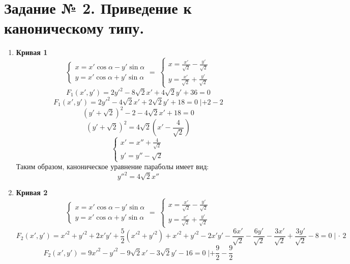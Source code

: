 \documentclass{article}
\theoremstyle{plain}
\begin{document}
\section{Задание № 2. Приведение к каноническому типу.}
\begin{enumerate}
    \item \textbf{Кривая 1}
    \begin{equation}
        \begin{cases}
        x = x'\cos{\alpha} - y'\sin{\alpha}\\
        y = x'\cos{\alpha} + y'\sin{\alpha}
        \end{cases} = \;
        \begin{cases}
        x = \frac{x'}{\sqrt{2}} - \frac{y'}{\sqrt{2}}\\
        y = \frac{x'}{\sqrt{2}} + \frac{y'}{\sqrt{2}}
        \end{cases}
    \end{equation}
    $$F_1(x', y') = 2y'^2 - 8\sqrt{2}x' + 4\sqrt{2}y' + 36 = 0$$
    $$F_1(x', y') = 2y'^2 - 4\sqrt{2}x' + 2\sqrt{2}y' + 18 = 0 \;| + 2 - 2$$
    $$ (y' + \sqrt{2})^2 - 2 - 4\sqrt{2}x' + 18 = 0$$
    $$ (y' + \sqrt{2})^2 = 4\sqrt{2}(x' - \frac{4}{\sqrt{2}})$$
    \begin{equation}
        \begin{cases}
        x' = x'' + \frac{4}{\sqrt{2}} \\
        y' = y'' - \sqrt{2}
        \end{cases}
    \end{equation}
    Таким образом, каноническое уравнение параболы имеет вид: $$y''^2 = 4\sqrt{2}x''$$
    \item \textbf{Кривая 2}
    \begin{equation}
    \begin{cases}
     x = x'\cos{\alpha} - y'\sin{\alpha}\\
    y = x'\cos{\alpha} + y'\sin{\alpha}
     \end{cases} = \;
        \begin{cases}
        x = \frac{x'}{\sqrt{2}} - \frac{y'}{\sqrt{2}}\\
        y = \frac{x'}{\sqrt{2}} + \frac{y'}{\sqrt{2}}
        \end{cases}
    \end{equation}
    $$F_2(x', y') = x'^2 + y'^2 + 2x'y' + \frac{5}{2}(x'^2 + y'^2) + x'^2 + y'^2 - 2x'y' - \frac{6x'}{\sqrt{2}} - \frac{6y'}{\sqrt{2}} - \frac{3x'}{\sqrt{2}} + \frac{3y'}{\sqrt{2}} - 8 = 0\; |\, \cdot\, 2$$
    $$F_2(x', y') = 9x'^2 - y'^2 - 9\sqrt{2}x' - 3\sqrt{2}y' - 16 = 0\; | + \frac{9}{2} - \frac{9}{2}$$

\end{enumerate}
\end{document}
